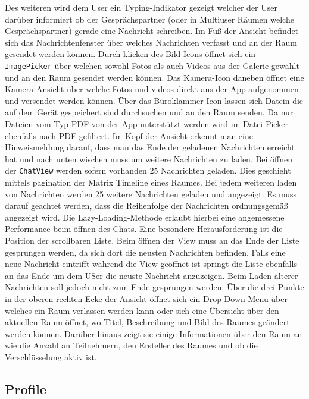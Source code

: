     Des weiteren wird dem User ein Typing-Indikator gezeigt welcher der User darüber informiert ob der Gesprächspartner (oder in Multiuser Räumen welche Gesprächspartner) gerade eine Nachricht schreiben.
    Im Fuß der Ansicht befindet sich das Nachrichtenfenster über welches Nachrichten verfasst und an der Raum gesendet werden können.
    Durch klicken des Bild-Icons öffnet sich ein \texttt{ImagePicker} über welchen sowohl Fotos als auch Videos aus der Galerie gewählt und an den Raum gesendet werden können.
    Das Kamera-Icon daneben öffnet eine Kamera Ansicht über welche Fotos und videos direkt aus der App aufgenommen und versendet werden können.
    Über das Büroklammer-Icon lassen sich Datein die auf dem Gerät gespeichert sind durchsuchen und an den Raum senden.
    Da nur Dateien vom Typ PDF von der App unterstützt werden wird im Datei Picker ebenfalls nach PDF gefiltert.
    Im Kopf der Ansicht erkennt man eine Hinweismeldung darauf, dass man das Ende der geladenen Nachrichten erreicht hat und nach unten wischen muss um weitere Nachrichten zu laden.
    Bei öffnen der \texttt{ChatView} werden sofern vorhanden 25 Nachrichten geladen.
    Dies geschieht mittels pagination der Matrix Timeline eines Raumes.
    Bei jedem weiteren laden von Nachrichten werden 25 weitere Nachrichten geladen und angezeigt.
    Es muss darauf geachtet werden, dass die Reihenfolge der Nachrichten ordnungsgemäß angezeigt wird.
    Die Lazy-Loading-Methode erlaubt hierbei eine angemessene Performance beim öffnen des Chats.
    Eine besondere Herausforderung ist die Position der scrollbaren Liste.
    Beim öffnen der View muss an das Ende der Liste gesprungen werden, da sich dort die neusten Nachrichten befinden.
    Falls eine neue Nachricht eintrifft während die View geöffnet ist springt die Liste ebenfalls an das Ende um dem USer die neuste Nachricht anzuzeigen.
    Beim Laden älterer Nachrichten soll jedoch nicht zum Ende gesprungen werden.
    Über die drei Punkte in der oberen rechten Ecke der Ansicht öffnet sich ein Drop-Down-Menu über welches ein Raum verlassen werden kann oder sich eine Übersicht über den aktuellen Raum öffnet, wo Titel, Beschreibung und Bild des Raumes geändert werden können.
    Darüber hinaus zeigt sie einige Informationen über den Raum an wie die Anzahl an Teilnehmern, den Ersteller des Raumes und ob die Verschlüsselung aktiv ist.

    \newpage
    \subsection{Profile}

